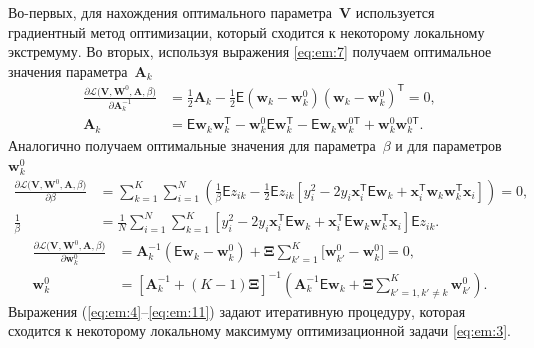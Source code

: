 Во-первых, для нахождения оптимального параметра~$\textbf{V}$ используется градиентный метод оптимизации, который сходится к некоторому локальному экстремуму.
Во вторых, используя выражения \eqref{eq:em:7} получаем оптимальное значения параметра~$\textbf{A}_{k}$
\[
\label{eq:em:9}
\begin{aligned}
\frac{\partial \mathcal{L}\bigr(\textbf{V}, \textbf{W}^{0}, \textbf{A}, \beta\bigr)}{\partial \textbf{A}^{-1}_k} &=  \frac{1}{2}\textbf{A}_{k} - \frac{1}{2}\mathsf{E}\left(\textbf{w}_{k} - \textbf{w}_{k}^{0}\right)\left(\textbf{w}_{k} - \textbf{w}_{k}^{0}\right)^{\mathsf{T}} = 0,\\
\textbf{A}_{k} &= \mathsf{E}\textbf{w}_{k}\textbf{w}_{k}^{\mathsf{T}} - \textbf{w}_{k}^{0}\mathsf{E}\textbf{w}_{k}^{\mathsf{T}} - \mathsf{E}\textbf{w}_{k}\textbf{w}_{k}^{0\mathsf{T}} + \textbf{w}_{k}^{0}\textbf{w}_{k}^{0\mathsf{T}}.
\end{aligned}
\]
Аналогично получаем оптимальные значения для параметра~$\beta$ и для параметров~$\textbf{w}_{k}^{0}$
\[
\label{eq:em:10}
\begin{aligned}
\frac{\partial \mathcal{L}\bigr(\textbf{V}, \textbf{W}^{0}, \textbf{A}, \beta\bigr)}{\partial \beta} &= \sum_{k=1}^{K}\sum_{i=1}^{N}\left(\frac{1}{\beta}\mathsf{E}z_{ik}-\frac{1}{2}\mathsf{E}z_{ik}\left[y_{i}^{2}-2y_{i}\textbf{x}_{i}^{\mathsf{T}}\mathsf{E}\textbf{w}_{k}+\textbf{x}_{i}^{\mathsf{T}}\textbf{w}_{k}\textbf{w}_{k}^{\mathsf{T}}\textbf{x}_{i}\right]\right) = 0,\\
\frac{1}{\beta}&=\frac{1}{N}\sum_{i=1}^{N}\sum_{k=1}^{K}\left[y_{i}^{2}-2y_{i}\textbf{x}_{i}^{\mathsf{T}}\mathsf{E}\textbf{w}_{k} + \textbf{x}_{i}^{\mathsf{T}}\mathsf{E}\textbf{w}_{k}\textbf{w}_{k}^{\mathsf{T}}\textbf{x}_{i}\right]\mathsf{E}z_{ik}.
\end{aligned}
\]
\[
\label{eq:em:11}
\begin{aligned}
\frac{\partial \mathcal{L}\bigr(\textbf{V}, \textbf{W}^{0}, \textbf{A}, \beta\bigr)}{\partial \mathbf{w}_k^0} &= \mathbf{A}_k^{-1}\left(\mathsf{E}\mathbf{w}_k - \mathbf{w}_{k}^{0}\right) + \bm{\Xi}\sum_{k'=1}^{K}\bigr[\mathbf{w}_{k'}^{0} -\mathbf{w}_{k}^{0}\bigr] = 0,\\
\textbf{w}_{k}^{0} &=\left[\textbf{A}_{k}^{-1}+\left(K-1\right)\bm{\Xi}\right]^{-1}\left(\textbf{A}^{-1}_{k}\mathsf{E}\textbf{w}_{k}+\bm{\Xi}\sum_{k'=1, k'\not=k}^{K}\textbf{w}_{k'}^{0}\right).
\end{aligned}
\]
Выражения (\ref{eq:em:4}--\ref{eq:em:11}) задают итеративную процедуру, которая сходится к некоторому локальному максимуму оптимизационной задачи \eqref{eq:em:3}.


